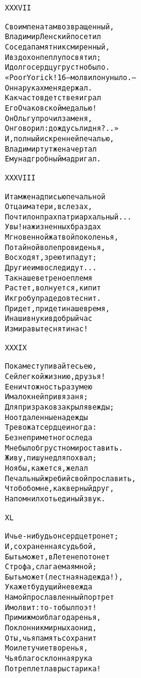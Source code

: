 \begin{minipage}[t]{\dimexpr 0.5\textwidth -\tabcolsep-.5pt}
\begin{alltt}\normalfont\centering
XXXVII

Своим пенатам возвращенный,
Владимир Ленский посетил
Соседа памятник смиренный,
И вздох он пеплу посвятил;
И долго сердцу грустно было.
«Poor Yorick! 16 — молвил он уныло. —
Он на руках меня держал.
Как часто в детстве я играл
Его Очаковской медалью!
Он Ольгу прочил за меня,
Он говорил: дождусь ли дня?..»
И, полный искренней печалью,
Владимир тут же начертал
Ему надгробный мадригал.
\end{alltt}
\end{minipage}

\begin{minipage}[t]{\dimexpr 0.5\textwidth -\tabcolsep-.5pt}
\begin{alltt}\normalfont\centering
XXXVIII

И там же надписью печальной
Отца и матери, в слезах,
Почтил он прах патриархальный...
Увы! на жизненных браздах
Мгновенной жатвой поколенья,
По тайной воле провиденья,
Восходят, зреют и падут;
Другие им вослед идут...
Так наше ветреное племя
Растет, волнуется, кипит
И к гробу прадедов теснит.
Придет, придет и наше время,
И наши внуки в добрый час
Из мира вытеснят и нас!
\end{alltt}
\end{minipage}
\clearpage

\begin{minipage}[t]{\dimexpr 0.5\textwidth -\tabcolsep-.5pt}
\begin{alltt}\normalfont\centering
XXXIX

Покамест упивайтесь ею,
Сей легкой жизнию, друзья!
Ее ничтожность разумею
И мало к ней привязан я;
Для призраков закрыл я вежды;
Но отдаленные надежды
Тревожат сердце иногда:
Без неприметного следа
Мне было б грустно мир оставить.
Живу, пишу не для похвал;
Но я бы, кажется, желал
Печальный жребий свой прославить,
Чтоб обо мне, как верный друг,
Напомнил хоть единый звук.
\end{alltt}
\end{minipage}

\begin{minipage}[t]{\dimexpr 0.5\textwidth -\tabcolsep-.5pt}
\begin{alltt}\normalfont\centering
XL

И чье-нибудь он сердце тронет;
И, сохраненная судьбой,
Быть может, в Лете не потонет
Строфа, слагаемая мной;
Быть может (лестная надежда!),
Укажет будущий невежда
На мой прославленный портрет
И молвит: то-то был поэт!
Прими ж мои благодаренья,
Поклонник мирных аонид,
О ты, чья память сохранит
Мои летучие творенья,
Чья благосклонная рука
Потреплет лавры старика!
\end{alltt}
\end{minipage}
